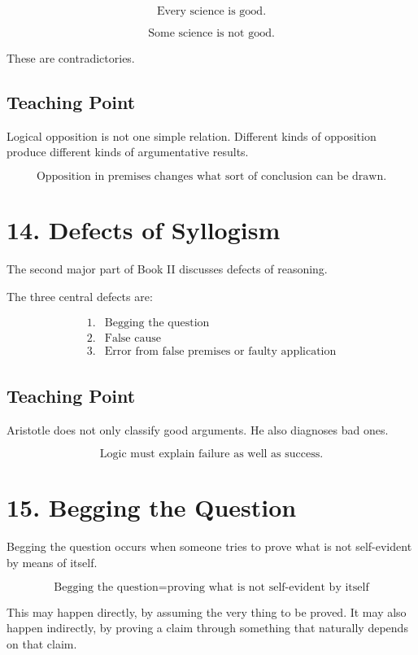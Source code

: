 \documentclass[12pt]{article}
\begin{document}
\[
\text{Every science is good.}
\]

\[
\text{Some science is not good.}
\]

These are contradictories.

\subsection*{Teaching Point}

Logical opposition is not one simple relation. Different kinds of opposition
produce different kinds of argumentative results.

\[
\boxed{
\text{Opposition in premises changes what sort of conclusion can be drawn.}
}
\]

\section*{14. Defects of Syllogism}

The second major part of Book II discusses defects of reasoning.

The three central defects are:

\[
\begin{array}{ll}
1. & \text{Begging the question} \\
2. & \text{False cause} \\
3. & \text{Error from false premises or faulty application}
\end{array}
\]

\subsection*{Teaching Point}

Aristotle does not only classify good arguments. He also diagnoses bad ones.

\[
\boxed{
\text{Logic must explain failure as well as success.}
}
\]

\section*{15. Begging the Question}

Begging the question occurs when someone tries to prove what is not self-evident
by means of itself.

\[
\boxed{
\text{Begging the question} =
\text{proving what is not self-evident by itself}
}
\]

This may happen directly, by assuming the very thing to be proved. It may also
happen indirectly, by proving a claim through something that naturally depends
on that claim.
\end{document}
